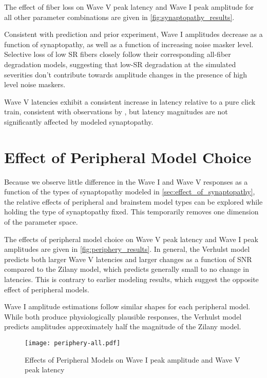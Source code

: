 The effect of fiber loss on Wave V peak latency and Wave I peak amplitude for all other parameter combinations are given in \autoref{fig:synaptopathy_results}.  

Consistent with prediction and prior experiment, Wave I amplitudes decrease as a function of synaptopathy, as well as a function of increasing noise masker level.  Selective loss of low SR fibers closely follow their corresponding all-fiber degradation models, suggesting that low-SR degradation at the simulated severities don't contribute towards amplitude changes in the presence of high level noise maskers. 

Wave V latencies exhibit a consistent increase in latency relative to a pure click train,  consistent with observations by \cite{Mehraei2016Auditory}, but latency magnitudes are not significantly affected by modeled synaptopathy. 

\section{Effect of Peripheral Model Choice} %
\label{sec:effect_of_peripheral_model}
Because we observe little difference in the Wave I and Wave V responses as a function of the types of synaptopathy modeled in \autoref{sec:effect_of_synaptopathy}, the relative effects of peripheral and brainstem model types can be explored while holding the type of synaptopathy fixed.  This temporarily removes one dimension of the parameter space. 

The effects of peripheral model choice on Wave V peak latency and Wave I peak amplitudes are given in \autoref{fig:periphery_results}.   In general, the Verhulst model predicts both larger Wave V latencies and larger changes as a function of SNR compared to the Zilany model, which predicts generally small to no change in latencies.  This is contrary to earlier modeling results, which suggest the opposite effect of peripheral models. 

Wave I amplitude estimations follow similar shapes for each peripheral model.  While both produce physiologically plausible responses, the Verhulst model predicts amplitudes approximately half the magnitude of the Zilany model. 

\begin{figure}[htbp]
	\centering
	\texttt{[image: periphery-all.pdf]}
	\caption[Effects of Peripheral Models]{Effects of Peripheral Models on Wave I peak amplitude and Wave V peak latency}
	\label{fig:periphery_results}
\end{figure}

